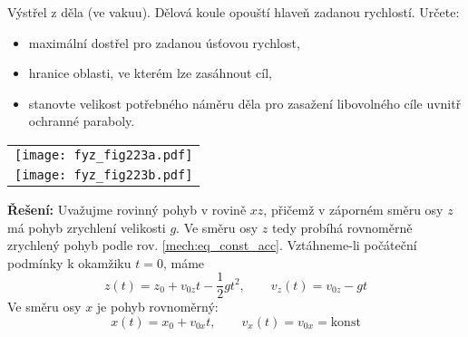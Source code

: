 \begin{example}Výstřel z děla (ve vakuu).
  Dělová koule opouští hlaveň zadanou rychlostí. Určete:
  \begin{itemize}\addtolength{\itemsep}{-0.5\baselineskip}
    \item maximální dostřel pro zadanou úsťovou rychlost,
    \item hranice oblasti, ve kterém lze zasáhnout cíl,
    \item stanovte velikost potřebného náměru děla pro zasažení libovolného cíle uvnitř ochranné paraboly.
  \end{itemize}

  {\centering
  \begin{tabular}{c}
       \texttt{[image: fyz\_fig223a.pdf]}      \\
       \texttt{[image: fyz\_fig223b.pdf]}
  \end{tabular} 
  \captionsetup{type=figure}  
  \label{fyz:fig223}
  \par}

  \textbf{Řešení:}
  Uvažujme rovinný pohyb v rovině $xz$, přičemž v záporném směru osy $z$ má pohyb zrychlení 
  velikosti $g$. Ve směru osy $z$ tedy probíhá rovnoměrně zrychlený pohyb podle rov. 
  \ref{mech:eq_const_acc}. Vztáhneme-li počáteční podmínky k okamžiku \(t = 0\), máme
  \begin{equation}\label{mech_eq_delo_vakuum_osa_z}
    z(t)=z_0+v_{0z}t-\frac{1}{2}gt^2, \qquad v_z(t)=v_{0z}-gt
  \end{equation}
  Ve směru osy $x$ je pohyb rovnoměrný:
  \begin{equation}\label{mech_eq_delo_vakuum_osa_x}
    x(t)=x_0+v_{0x} t,\qquad v_x(t)=v_{0x}=\mathrm{konst}
  \end{equation}


\end{example}
